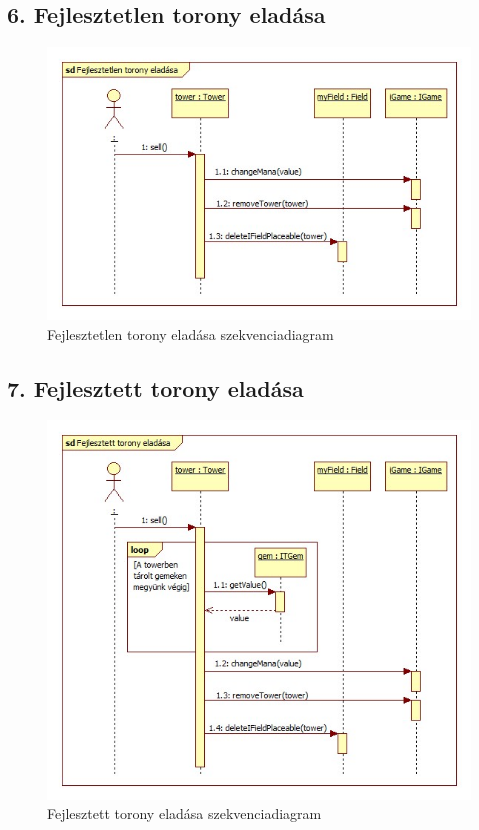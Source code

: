 \subsection{6. Fejlesztetlen torony eladása}
\begin{figure}[H]
\begin{center}
\includegraphics[width=17cm]{chapters/chapter05/images/sd_Fejlesztetlen_torony_eladasa.jpg}
\caption{Fejlesztetlen torony eladása szekvenciadiagram}
\label{fig:sd_Fejlesztetlen_torony_eladasa}
\end{center}
\end{figure}

\subsection{7. Fejlesztett torony eladása}
\begin{figure}[H]
\begin{center}
\includegraphics[width=17cm]{chapters/chapter05/images/sd_Fejlesztett_torony_eladasa.jpg}
\caption{Fejlesztett torony eladása szekvenciadiagram}
\label{fig:sd_Fejlesztett_torony_eladasa}
\end{center}
\end{figure}

